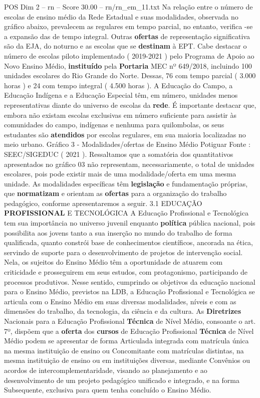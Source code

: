 \begin{textsample}{POS Dim 2 – rn – Score 30.00 – rn/rn\_em\_11.txt}
Na relação entre o número de escolas de ensino médio da Rede Estadual e suas modalidades, observada no gráfico abaixo, prevalecem as regulares em tempo parcial, no entanto, verifica -se a expansão das de tempo integral.
Outras \textbf{ofertas} de representação significativa são da EJA, do noturno e as escolas que se \textbf{destinam} à EPT.
Cabe destacar o número de escolas piloto implementado ( 2019-2021 ) pelo Programa de Apoio ao Novo Ensino Médio, \textbf{instituído} pela \textbf{Portaria} MEC nº 649/2018, incluindo 100 unidades escolares do Rio Grande do Norte.
Dessas, 76 com tempo parcial ( 3.000 horas ) e 24 com tempo integral ( 4.500 horas ).
A Educação do Campo, a Educação Indígena e a Educação Especial têm, em número, unidades menos representativas diante do universo de escolas da \textbf{rede}.
É importante destacar que, embora não existam escolas exclusivas em número suficiente para assistir às comunidades do campo, indígenas e nenhuma para quilombolas, os seus estudantes são \textbf{atendidos} por escolas regulares, em sua maioria localizadas no meio urbano.
Gráfico 3 - Modalidades/ofertas de Ensino Médio Potiguar Fonte : SEEC/SIGEDUC ( 2021 ).
Ressaltamos que a somatória dos quantitativos apresentados no gráfico 03 não representam, necessariamente, o total de unidades escolares, pois pode existir mais de uma modalidade/oferta em uma mesma unidade.
As modalidades específicas têm \textbf{legislação} e fundamentação próprias, que \textbf{normatizam} e orientam as \textbf{ofertas} para a organização do trabalho pedagógico, conforme apresentaremos a seguir. 3.1 EDUCAÇÃO \textbf{PROFISSIONAL} E TECNOLÓGICA A Educação Profissional e Tecnológica tem sua importância no universo juvenil enquanto \textbf{política} pública nacional, pois possibilita aos jovens tanto a sua inserção no mundo do trabalho de forma qualificada, quanto constrói base de conhecimentos científicos, ancorada na ética, servindo de suporte para o desenvolvimento de projetos de intervenção social.
Nela, os sujeitos do Ensino Médio têm a oportunidade de atuarem com criticidade e prosseguirem em seus estudos, com protagonismo, participando de processos produtivos.
Nesse sentido, cumprindo os objetivos da educação nacional para o Ensino Médio, previstos na LDB, a Educação Profissional e Tecnológica se articula com o Ensino Médio em suas diversas modalidades, níveis e com as dimensões do trabalho, da tecnologia, da ciência e da cultura.
As \textbf{Diretrizes} Nacionais para a Educação Profissional \textbf{Técnica} de Nível Médio, consoante o art. 7º, dispõem que a \textbf{oferta} dos \textbf{cursos} de Educação Profissional \textbf{Técnica} de Nível Médio podem se apresentar de forma Articulada integrada com matrícula única na mesma instituição de ensino ou Concomitante com matrículas distintas, na mesma instituição de ensino ou em instituições diversas, mediante Convênios ou acordos de intercomplementaridade, visando ao planejamento e ao desenvolvimento de um projeto pedagógico unificado e integrado, e na forma Subsequente, exclusiva para quem tenha concluído o Ensino Médio.

\end{textsample}
